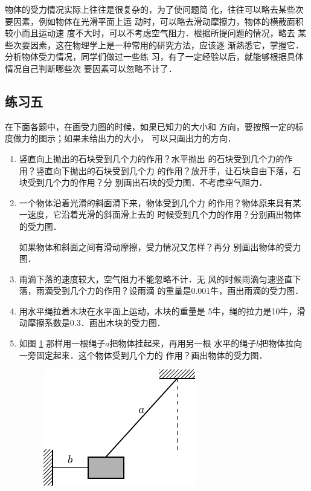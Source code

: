     物体的受力情况实际上往往是很复杂的，为了使问题简
化，往往可以略去某些次要因素，例如物体在光滑平面上运
动时，可以略去滑动摩擦力，物体的横截面积较小而且运动速
度不大时，可以不考虑空气阻力．根据所提问题的情况，略去
某些次要因素，这在物理学上是一种常用的研究方法，应该逐
渐熟悉它，掌握它．
分析物体受力情况，同学们做过一些练
习，有了一定经验以后，就能够根据具体情况自己判断哪些次
要因素可以忽略不计了．

\subsection*{练习五} 
    在下面各题中，在画受力图的时候，如果已知力的大小和
方向，要按照一定的标度做力的图示；如果未给出力的大小，
可以只画出力的方向．
\begin{enumerate} 
\item 竖直向上抛出的石块受到几个力的作用？水平抛出
的石块受到几个力的作用？竖直向下抛出的石块受到几个力
的作用？放开手，让石块自由下落，石块受到几个力的作用？分
别画出石块的受力图．不考虑空气阻力．

\item 一个物体沿着光滑的斜面滑下来，物体受到几个力
的作用？物体原来具有某一速度，它沿着光滑的斜面滑上去的
时候受到几个力的作用？分别画出物体的受力图．

    如果物体和斜面之间有滑动摩擦，受力情况又怎样？再分
别画出物体的受力图．

\item 雨滴下落的速度较大，空气阻力不能忽略不计．无
风的时候雨滴匀速竖直下落，雨滴受到几个力的作用？设雨滴
的重量是0.001牛，画出雨滴的受力图．

\item 用水平绳拉着木块在水平面上运动，木块的重量是
5牛，绳的拉力是10牛，滑动摩擦系数是0.3．画出木块的受力图．

\item 如图 \ref{fig_A_1-21} 那样用一根绳子$a$把物体挂起来，再用另一根
水平的绳子$b$把物体拉向一旁固定起来．这个物体受到几个力的
作用？画出物体的受力图．

\begin{figure} [htp]\centering
\includegraphics{fig/A/1-21.pdf} 
\caption{} \label{fig_A_1-21} 
\end{figure} 


\end{enumerate}
